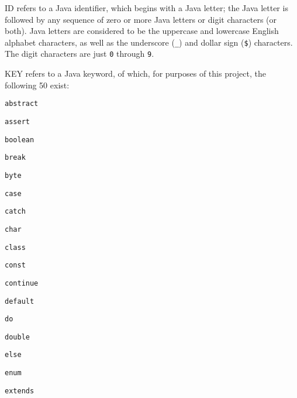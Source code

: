 \documentclass[11pt]{article}
\begin{document}
        \begin{description}

          \addtolength{\itemsep}{.75mm}

          \item[ID:] ID refers to a Java identifier, which begins with a
                Java letter; the Java letter is followed by any sequence of
                zero or more Java letters or digit characters (or both).
                Java letters are considered to be the uppercase and
                lowercase English alphabet characters, as well as the
                underscore (\texttt{\_}) and dollar sign (\texttt{\$})
                characters.  The digit characters are just \texttt{0}
                through \texttt{9}.

          \item[KEY:] KEY refers to a Java keyword, of which, for purposes
                of this project, the following 50 exist:

                \vspace{-2.5mm}

                \begin{multicols}{5}

                  \addtolength{\baselineskip}{-.75mm}

                  \texttt{abstract}

                  \texttt{assert}

                  \texttt{boolean}

                  \texttt{break}

                  \texttt{byte}

                  \texttt{case}

                  \texttt{catch}

                  \texttt{char}

                  \texttt{class}

                  \texttt{const}

                  \texttt{continue}

                  \texttt{default}

                  \texttt{do}

                  \texttt{double}

                  \texttt{else}

                  \texttt{enum}

                  \texttt{extends}


\end{multicols}
\end{description}
\end{document}
